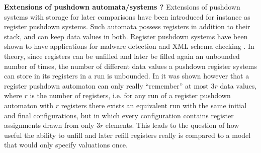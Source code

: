 \documentclass[a4paper,UKenglish,cleveref, autoref, thm-restate]{lipics-v2021}
\begin{document}
{\bf Extensions of  pushdown automata/systems ?}
Extensions of pushdown systems with storage for later comparisons
have been introduced for instance as register pushdown systems. 
Such automata possess registers in addition to their stack, and can keep data values in both.
Register pushdown systems have been shown to have applications for malware detection and XML schema checking \cite{senda2021forward, senda2021ltl}. 
In theory, since registers can be unfilled and later be filled again an unbounded number of times, the number of different data values a pushdown register systems can store in its registers in a run is unbounded.  
In \cite{murawski2017reachability} it was shown however that a register pushdown automaton can
only really ``remember'' at most  $3r$ data values, where $r$ is the number of registers,
i.e. for any run of a register pushdown automaton with $r$ registers there exists an equivalent run %
 with the same initial and final conﬁgurations, but in which every configuration contains register assignments drawn from only $3r$ elements. This 
 leads to
 the
  question
  of
   how useful the ability to unfill and later refill registers really is compared to a model that would only specify valuations once.



%
\end{document}
